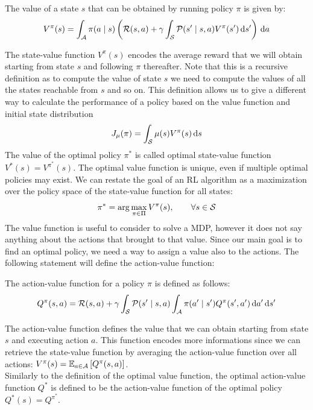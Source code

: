 \begin{definition}
The value of a state $s$ that can be obtained by running policy $\pi$ is given by:
\[
V^{\pi}(s) = \int_{\aspace} \pi(a \mid s) \left( \rfunc(s,a) + \gamma \int_{\sspace} \tfunc(s' \mid s, a) V^{\pi} (s') \de s' \right) \de a
\]
\end{definition}

The state-value function $V^\pi(s)$ encodes the average reward that we will obtain starting from state $s$ and following $\pi$ thereafter. Note that this is a recursive definition as to compute the value of state $s$ we need to compute the values of all the states reachable from $s$ and so on. This definition allows us to give a different way to calculate the performance of a policy based on the value function and initial state distribution
\[
J_\mu(\pi) = \int_{\sspace}\mu(s)V^\pi(s)\de s
\]
The value of the optimal policy $\pi^*$ is called optimal state-value function $V^*(s) = V^{\pi^*}(s)$. The optimal value function is unique, even if multiple optimal policies may exist. We can restate the goal of an RL algorithm as a maximization over the policy space of the state-value function for all states:
\[
\pi^* = \arg\max_{\pi \in \Pi} V^\pi(s),\qquad \forall s \in \sspace
\]
The value function is useful to consider to solve a MDP, however it does not say anything about the actions that brought to that value. Since our main goal is to find an optimal policy, we need a way to assign a value also to the actions. The following statement will define the action-value function:

\begin{definition}
The action-value function for a policy $\pi$ is defined as follows:
\[
Q^{\pi}(s, a) = \rfunc(s, a) + \gamma \int_{\sspace} \tfunc (s' \mid s, a) \int_{\aspace} \pi(a' \mid s') Q^{\pi} (s', a') \de a' \de s'
\]
\end{definition}

The action-value function defines the value that we can obtain starting from state $s$ and executing action $a$. This function encodes more informations since we can retrieve the state-value function by averaging the action-value function over all actions: $V^\pi(s) = \EV[a\in\aspace]{Q^\pi(s,a)}$. \\
Similarly to the definition of the optimal value function, the optimal action-value function $Q^*$ is defined to be the action-value function of the optimal policy $Q^*(s) = Q^{\pi^*}$. 

